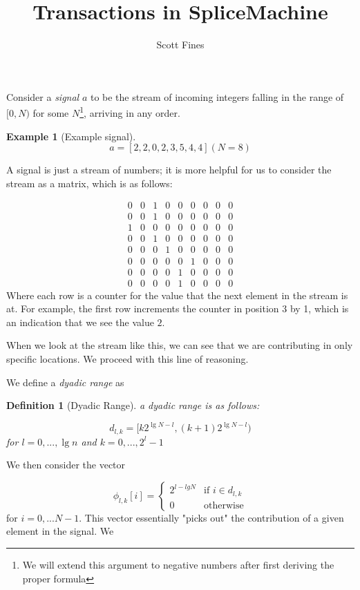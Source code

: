 \documentclass[10pt]{amsart}
\newtheorem{defn}{Definition}[section]
\newtheorem{exmp}{Example}[section]
\begin{document}
\title{Transactions in SpliceMachine}
\author{Scott Fines}

Consider a \emph{signal} $a$ to be the stream of incoming integers falling in the range of $[0,N)$ for some $N$\footnote{We will extend this argument to negative numbers after first deriving the proper formula}, arriving in any order.

\begin{exmp}[Example signal]
\begin{displaymath}
a = [2,2,0,2,3,5,4,4] (N=8)
\end{displaymath}
\end{exmp}
A signal is just a stream of numbers; it is more helpful for us to consider the stream as a matrix, which is as follows:

\begin{displaymath}
\begin{array}{ccccccccc}
	0 & 0 & 1 & 0 & 0 & 0 & 0 & 0 & 0 \\
	0 & 0 & 1 & 0 & 0 & 0 & 0 & 0 & 0 \\
	1 & 0 & 0 & 0 & 0 & 0 & 0 & 0 & 0 \\
	0 & 0 & 1 & 0 & 0 & 0 & 0 & 0 & 0 \\
	0 & 0 & 0 & 1 & 0 & 0 & 0 & 0 & 0 \\
	0 & 0 & 0 & 0 & 0 & 1 & 0 & 0 & 0 \\
	0 & 0 & 0 & 0 & 1 & 0 & 0 & 0 & 0 \\
	0 & 0 & 0 & 0 & 1 & 0 & 0 & 0 & 0 
\end{array}
\end{displaymath}
Where each row is a counter for the value that the next element in the stream is at. For example, the first row increments the counter in position 3 by 1, which is an indication that we see the value $2$.

When we look at the stream like this, we can see that we are contributing in only specific locations. We proceed with this line of reasoning.

We define a \emph{dyadic range} as
\begin{defn}[Dyadic Range]
a \emph{dyadic range} is as follows:

\begin{displaymath}
d_{l,k} = [k2^{\lg{N}-l},(k+1)2^{\lg{N}-l})
\end{displaymath}
for $l=0,...,\lg{n}$ and $k=0,...,2^l-1$
\end{defn}

We then consider the vector

\begin{displaymath}
\phi_{l,k}[i] = \begin{cases} 2^{l-lgN} &\mbox{if } i \in d_{l,k} \\ 0 & \mbox{otherwise} \end{cases}
\end{displaymath}
for $i=0,...N-1$. This vector essentially "picks out" the contribution of a given element in the signal. We 
\end{document}
